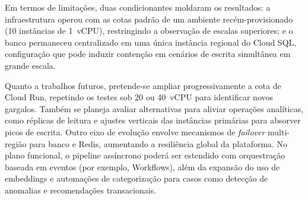 Em termos de limitações, duas condicionantes moldaram os resultados: a
infraestrutura operou com as cotas padrão de um ambiente recém-provisionado (10
instâncias de 1~vCPU), restringindo a observação de escalas superiores; e o
banco permaneceu centralizado em uma única instância regional do Cloud SQL,
configuração que pode induzir contenção em cenários de escrita simultânea em
grande escala.

Quanto a trabalhos futuros, pretende-se ampliar progressivamente a cota de Cloud
Run, repetindo os testes sob 20 ou 40~vCPU para identificar novos gargalos.
Também se planeja avaliar alternativas para aliviar operações analíticas, como
réplicas de leitura e ajustes verticais das instâncias primárias para absorver
picos de escrita. Outro eixo de evolução envolve mecanismos de \textit{failover}
multi-região para banco e Redis, aumentando a resiliência global da plataforma.
No plano funcional, o pipeline assíncrono poderá ser estendido com orquestração
baseada em eventos (por exemplo, Workflows), além da expansão do uso de
embeddings e automações de categorização para casos como detecção de anomalias e
recomendações transacionais.
